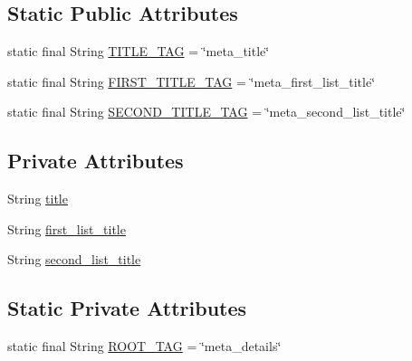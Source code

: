 \subsection*{Static Public Attributes}
\begin{DoxyCompactItemize}
\item 
static final String \hyperlink{classorg_1_1buildmlearn_1_1toolkit_1_1templates_1_1MatchMetaModel_a565a17bc9d90fd6ce54d18a58d026a7d}{T\+I\+T\+L\+E\+\_\+\+T\+AG} = \char`\"{}meta\+\_\+title\char`\"{}
\item 
static final String \hyperlink{classorg_1_1buildmlearn_1_1toolkit_1_1templates_1_1MatchMetaModel_a2b4ac17e1557c79025b15c93d3a2212d}{F\+I\+R\+S\+T\+\_\+\+T\+I\+T\+L\+E\+\_\+\+T\+AG} = \char`\"{}meta\+\_\+first\+\_\+list\+\_\+title\char`\"{}
\item 
static final String \hyperlink{classorg_1_1buildmlearn_1_1toolkit_1_1templates_1_1MatchMetaModel_a6d3041361ff59a92751b42af0bb60248}{S\+E\+C\+O\+N\+D\+\_\+\+T\+I\+T\+L\+E\+\_\+\+T\+AG} = \char`\"{}meta\+\_\+second\+\_\+list\+\_\+title\char`\"{}
\end{DoxyCompactItemize}
\subsection*{Private Attributes}
\begin{DoxyCompactItemize}
\item 
String \hyperlink{classorg_1_1buildmlearn_1_1toolkit_1_1templates_1_1MatchMetaModel_af8bb459139f9fc8fe759c8c3e3060c51}{title}
\item 
String \hyperlink{classorg_1_1buildmlearn_1_1toolkit_1_1templates_1_1MatchMetaModel_aa911346ed99166f949387781a6480618}{first\+\_\+list\+\_\+title}
\item 
String \hyperlink{classorg_1_1buildmlearn_1_1toolkit_1_1templates_1_1MatchMetaModel_ac94b3ae40c469587ef02351201f71040}{second\+\_\+list\+\_\+title}
\end{DoxyCompactItemize}
\subsection*{Static Private Attributes}
\begin{DoxyCompactItemize}
\item 
static final String \hyperlink{classorg_1_1buildmlearn_1_1toolkit_1_1templates_1_1MatchMetaModel_ac578f65305e9146e6e17cb67b98f53c4}{R\+O\+O\+T\+\_\+\+T\+AG} = \char`\"{}meta\+\_\+details\char`\"{}
\end{DoxyCompactItemize}


